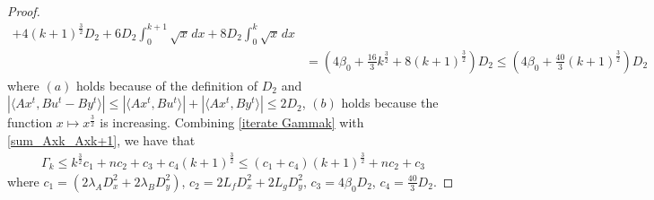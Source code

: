 \documentclass{article}
\numberwithin{equation}{section}
\begin{document}
\begin{proof}
\begin{align}
        + 4(k+1)^{\frac{3}{2}}D_2+ 6D_2 \int_{0}^{k+1} \sqrt{x} \hspace{1pt}dx 
        +8D_2 \int_0^{k} \sqrt{x} \hspace{1pt} dx \nonumber \\
        & = \left(4\beta_0+\frac{16}{3}k^{\frac{3}{2}}+ 8(k+1)^{\frac{3}{2}}\right) D_2 \leq \left(4\beta_0+\frac{40}{3}(k+1)^{\frac{3}{2}}\right)D_2
        \label{sum_Axk_Axk+1}
    \end{align}
    where $(a)$ holds because of the definition of $D_2$ and $\left| \langle Ax^t, Bu^t - By^t \rangle \right|
    \leq \left| \langle Ax^t, Bu^t \rangle \right| + \left|\langle Ax^t,By^t \rangle\right| \leq 2D_2$, 
    $(b)$ holds because the function $x \mapsto x^{\frac{3}{2}}$ is increasing. 
    Combining \eqref{iterate Gammak} with \eqref{sum_Axk_Axk+1}, we have that
    \begin{align}
        \Gamma_k \leq k^{\frac{3}{2}}c_1 + nc_2 + c_3 + c_4(k+1)^{\frac{3}{2}} \leq (c_1+c_4)(k+1)^{\frac{3}{2}} +nc_2 +c_3   
    \end{align}
    where $c_1= (2\lambda_{A} D_x^2+ 2\lambda_{B} D_y^2)$, $c_2=2L_fD_x^2+2L_gD_y^2$, $c_3=4\beta_0D_2$, $c_4 = \frac{40}{3}D_2$. 
    

\end{proof}
\end{document}
